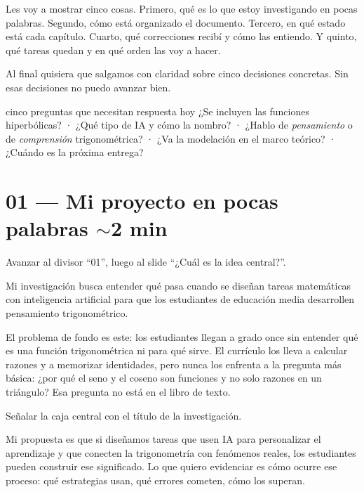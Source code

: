 \documentclass[11pt, letterpaper]{article}
\newenvironment{accion}{%
  \par\smallskip
  \color{GrisAnotacion}\small\itshape\faHandPointRight\enspace
}{%
  \par\smallskip\normalcolor\normalsize\normalfont
}
\begin{document}
Les voy a mostrar cinco cosas. Primero, qué es lo que estoy investigando en pocas palabras. Segundo, cómo está organizado el documento. Tercero, en qué estado está cada capítulo. Cuarto, qué correcciones recibí y cómo las entiendo. Y quinto, qué tareas quedan y en qué orden las voy a hacer.

Al final quisiera que salgamos con claridad sobre cinco decisiones concretas.
Sin esas decisiones no puedo avanzar bien.

\begin{decision}{cinco preguntas que necesitan respuesta hoy}
  ¿Se incluyen las funciones hiperbólicas? ·
  ¿Qué tipo de IA y cómo la nombro? ·
  ¿Hablo de \textit{pensamiento} o de \textit{comprensión} trigonométrica? ·
  ¿Va la modelación en el marco teórico? ·
  ¿Cuándo es la próxima entrega?
\end{decision}

\section{01 — Mi proyecto en pocas palabras \hfill {\normalfont\small\color{GrisAnotacion}$\sim$2 min}}

\begin{accion}
  Avanzar al divisor ``01'', luego al slide ``¿Cuál es la idea central?''.
\end{accion}

Mi investigación busca entender qué pasa cuando se diseñan tareas ma\-te\-má\-ti\-cas con inteligencia artificial para que los estudiantes de educación media desarrollen pensamiento trigonométrico.

El problema de fondo es este: los estudiantes llegan a grado once sin entender qué es una función trigonométrica ni para qué sirve. El currículo los lleva a calcular razones y a memorizar identidades, pero nunca los enfrenta a la pregunta más básica: ¿por qué el seno y el coseno son funciones y no solo razones en un triángulo? Esa pregunta no está en el libro de texto.

\begin{accion}
  Señalar la caja central con el título de la investigación.
\end{accion}

Mi propuesta es que si diseñamos tareas que usen IA para personalizar el aprendizaje y que conecten la trigonometría con fenómenos reales, los estudiantes pueden construir ese significado. Lo que quiero evidenciar es cómo ocurre ese proceso: qué estrategias usan, qué errores cometen, cómo los superan.
\end{document}
